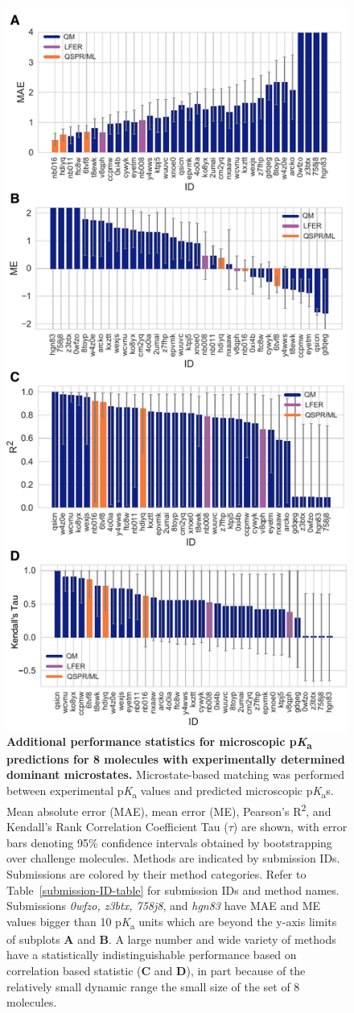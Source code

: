 \documentclass[9pt,lineno,final]{elife}
\newcommand{\pKa}{p\textit{K}\textsubscript{a}}
\begin{document}


\begin{figure}
\centering
\includegraphics[width=0.5\linewidth]{figures/typeI_statistics.pdf}
\caption{{\bf Additional performance statistics for microscopic \pKa{} predictions for 8 molecules with experimentally determined dominant microstates.} 
Microstate-based matching was performed between experimental \pKa{} values and predicted microscopic \pKa{}s. 
Mean absolute error (MAE), mean error (ME), Pearson’s R\textsuperscript{2}, and Kendall’s Rank Correlation Coefficient Tau ($\tau$) are shown, with error bars denoting 95\% confidence intervals obtained by bootstrapping over challenge molecules. Methods are indicated by submission IDs. Submissions are colored by their method categories. Refer to Table~\ref{submission-ID-table} for submission IDs and method names. Submissions \textit{0wfzo, z3btx, 758j8}, and \textit{hgn83} have MAE and ME values bigger than 10 \pKa{} units which are beyond the y-axis limits of subplots {\bf A} and {\bf B}. A large number and wide variety of methods have a statistically indistinguishable performance based on correlation based statistic ({\bf C} and {\bf D}), in part because of the relatively small dynamic range the small size of the set of 8 molecules.
}
\label{fig:typeI-statistics}
\end{figure}
\end{document}
